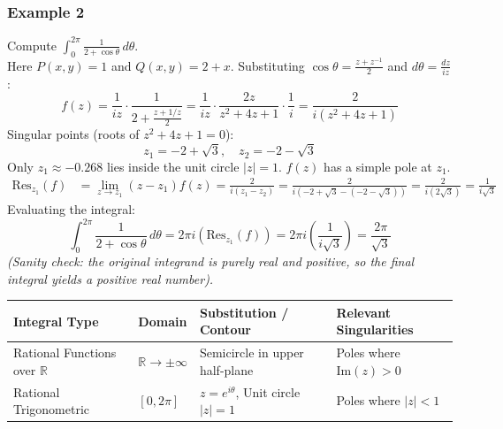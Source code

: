 \subsubsection{Example 2}
Compute $\int_0^{2\pi} \frac{1}{2+\cos\theta} \, d\theta$. \\
Here $P(x,y)=1$ and $Q(x,y) = 2+x$. Substituting $\cos\theta = \frac{z+z^{-1}}{2}$ and $d\theta = \frac{dz}{iz}$:
\begin{equation*}
f(z) = \frac{1}{iz} \cdot \frac{1}{2 + \frac{z+1/z}{2}} = \frac{1}{iz} \cdot \frac{2z}{z^2 + 4z + 1} \cdot \frac{1}{i} = \frac{2}{i(z^2 + 4z + 1)}
\end{equation*}
Singular points (roots of $z^2+4z+1=0$):
\begin{equation*}
z_{1} = -2+\sqrt{3}, \quad z_2 = -2-\sqrt{3}
\end{equation*}
Only $z_1 \approx -0.268$ lies inside the unit circle $|z|=1$. $f(z)$ has a simple pole at $z_1$.
\begin{align*}
\text{Res}_{z_1}(f) &= \lim_{z \to z_1} (z-z_1) f(z) = \frac{2}{i(z_1 - z_2)} = \frac{2}{i(-2+\sqrt{3} - (-2-\sqrt{3}))} = \frac{2}{i(2\sqrt{3})} = \frac{1}{i\sqrt{3}}
\end{align*}
Evaluating the integral:
\begin{equation}
\int_0^{2\pi} \frac{1}{2+\cos\theta} \, d\theta = 2\pi i \left( \text{Res}_{z_1}(f) \right) = 2\pi i \left( \frac{1}{i\sqrt{3}} \right) = \frac{2\pi}{\sqrt{3}}
\end{equation}
\textit{(Sanity check: the original integrand is purely real and positive, so the final integral yields a positive real number).}

\vspace{1cm}

\begin{tcolorbox}[colback=white, colframe=black, title=Summary Table: Contour Integration Strategies]
\centering
\begin{tabular}{@{}llll@{}}
\toprule
\textbf{Integral Type} & \textbf{Domain} & \textbf{Substitution / Contour} & \textbf{Relevant Singularities} \\
\midrule
Rational Functions over $\mathbb{R}$ & $\mathbb{R} \to \pm\infty$ & Semicircle in upper half-plane & Poles where $\text{Im}(z) > 0$ \\
Rational Trigonometric & $[0, 2\pi]$ & $z = e^{i\theta}$, Unit circle $|z|=1$ & Poles where $|z| < 1$ \\
\bottomrule
\end{tabular}
\end{tcolorbox}